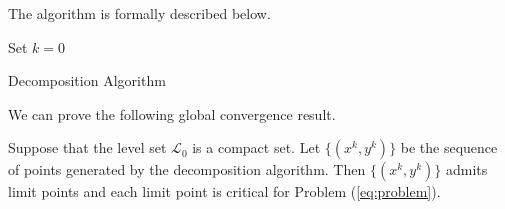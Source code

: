 The algorithm is formally described below.

\begin{algorithm}[ht]
 Set $k = 0$\\
 \caption{Decomposition Algorithm}
 \label{alg:decMVP}
\end{algorithm}
\par\bigskip\noindent
We can prove the following global convergence result.
\begin{proposition}
Suppose that the level set $\mathcal{L}_0$ is a compact set. Let $\{(x^k, y^k)\}$ be the sequence of points generated by the decomposition algorithm. Then
$\{(x^k, y^k)\}$ admits limit points and each limit point is critical for Problem (\ref{eq:problem}).
\end{proposition}

